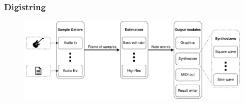 \documentclass[table]{beamer}
\begin{document}
\begin{frame}
\frametitle{Digistring}
    \begin{figure}[H]
        \includegraphics[width=0.90\linewidth]{figures/digistring_overview2.png}
    \end{figure}
\end{frame}



\end{document}
